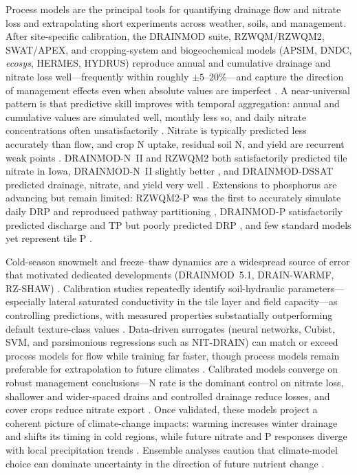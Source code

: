 Process models are the principal tools for quantifying drainage flow and
nitrate loss and extrapolating short experiments across weather, soils, and
management. After site-specific calibration, the DRAINMOD suite, RZWQM/RZWQM2,
SWAT/APEX, and cropping-system and biogeochemical models (APSIM, DNDC,
\textit{ecosys}, HERMES, HYDRUS) reproduce annual and cumulative drainage and
nitrate loss well---frequently within roughly $\pm5$--$20\%$---and capture the
direction of management effects even when absolute values are imperfect
\parencite{Youssef2018,Negm2014,Singh2020b,Dayyani2010,Ma2001}. A near-universal
pattern is that predictive skill improves with temporal aggregation: annual
and cumulative values are simulated well, monthly less so, and daily nitrate
concentrations often unsatisfactorily
\parencite{Liang2018,Ikenberry2017,Marjerison2016,Ojeda2018,Qi2025}. Nitrate is
typically predicted less accurately than flow, and crop N uptake, residual
soil N, and yield are recurrent weak points \parencite{Ma2007,Ahuja2007}.
DRAINMOD-N~II and RZWQM2 both satisfactorily predicted tile nitrate in Iowa,
DRAINMOD-N~II slightly better \parencite{Du2017,Qi2012}, and DRAINMOD-DSSAT
predicted drainage, nitrate, and yield very well
\parencite{Negm2014,Negm2017,Singh2022c}. Extensions to phosphorus are
advancing but remain limited: RZWQM2-P was the first to accurately simulate
daily DRP and reproduced pathway partitioning
\parencite{Sadhukhan2019,Grewal2025,BinShokrana2023b}, DRAINMOD-P satisfactorily
predicted discharge and TP but poorly predicted DRP
\parencite{Askar2021,Askar2025}, and few standard models yet represent tile P
\parencite{Radcliffe2015,Wang2020b}.

Cold-season snowmelt and freeze--thaw dynamics are a widespread source of error
that motivated dedicated developments (DRAINMOD~5.1, DRAIN-WARMF, RZ-SHAW)
\parencite{Wang2006c,Dayyani2010b,Li2024b}. Calibration studies repeatedly
identify soil-hydraulic parameters---especially lateral saturated conductivity
in the tile layer and field capacity---as controlling predictions, with
measured properties substantially outperforming default texture-class values
\parencite{Ma2007c,Ahuja2007,Malone2017}. Data-driven surrogates (neural
networks, Cubist, SVM, and parsimonious regressions such as NIT-DRAIN) can
match or exceed process models for flow while training far faster, though
process models remain preferable for extrapolation to future climates
\parencite{Sharma2003,Negm2016,Frederiksen2023,Chelil2022,Li2025}. Calibrated
models converge on robust management conclusions---N rate is the dominant
control on nitrate loss, shallower and wider-spaced drains and controlled
drainage reduce losses, and cover crops reduce nitrate export
\parencite{Moriasi2013,Fang2012,Malone2007c,Youssef2023}. Once validated,
these models project a coherent picture of climate-change impacts: warming
increases winter drainage and shifts its timing in cold regions, while future
nitrate and P responses diverge with local precipitation trends
\parencite{Li2025,Rasmussen2018,Jeantet2022,Haghnazari2020,Dialameh2025,Wang2021,Mehan2019,Adhikari2020}.
Ensemble analyses caution that climate-model choice can dominate uncertainty
in the direction of future nutrient change \parencite{Kujawa2020}.


